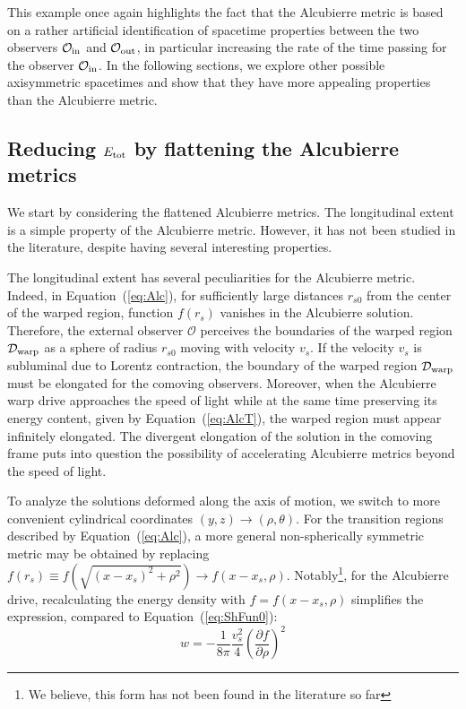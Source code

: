 \documentclass[10pt]{iopart}
\begin{document}
This example once again highlights the fact that the Alcubierre metric is based on a rather artificial identification of spacetime properties between the two observers $\mathcal{O}_{\rm in}$ and $\mathcal{O}_{\rm out}$, in particular increasing the rate of the time passing for the observer $\mathcal{O}_{\rm in}$. In the following sections, we explore other possible axisymmetric spacetimes and show that they have more appealing properties than the Alcubierre metric.

\subsection{Reducing $E_{\rm tot}$ by flattening the Alcubierre metrics}
\label{sec:AlcDeformed}

We start by considering the flattened Alcubierre metrics. The longitudinal extent is a simple property of the Alcubierre metric. However, it has not been studied in the literature, despite having several interesting properties.

The longitudinal extent has several peculiarities for the Alcubierre metric. Indeed, in Equation~(\ref{eq:Alc}), for sufficiently large distances $r_{s0}$ from the center of the warped region, function $f(r_s)$ vanishes in the Alcubierre solution. Therefore, the external observer $\mathcal{O}$ perceives the boundaries of the warped region $\mathcal{D}_{\rm warp}$ as a sphere of radius $r_{s0}$ moving with velocity $v_s$. If the velocity $v_s$ is subluminal due to Lorentz contraction, the boundary of the warped region $\mathcal{D}_{\rm warp}$ must be elongated for the comoving observers. Moreover, when the Alcubierre warp drive approaches the speed of light while at the same time preserving its energy content, given by Equation~(\ref{eq:AlcT}), the warped region must appear infinitely elongated. The divergent elongation of the solution in the comoving frame puts into question the possibility of accelerating Alcubierre metrics beyond the speed of light.

To analyze the solutions deformed along the axis of motion, we switch to more convenient cylindrical coordinates $(y,z)\rightarrow (\rho,\theta)$. For the transition regions described by Equation~(\ref{eq:Alc}), a more general non-spherically symmetric metric may be obtained by replacing $f(r_s)\equiv f(\sqrt{(x-x_s)^2+\rho^2}) \longrightarrow f(x-x_s, \rho)$. Notably\footnote{We believe, this form has not been found in the literature so far}, for the Alcubierre drive, recalculating the energy density with $f = f(x-x_s, \rho)$ simplifies the expression, compared to Equation~(\ref{eq:ShFun0}):
\begin{equation}
   w=-\frac{1}{8\pi}\frac{v_s^2}{4}\left(\frac{{\partial} f}{{\partial} \rho}\right)^2
\end{equation}
\end{document}
